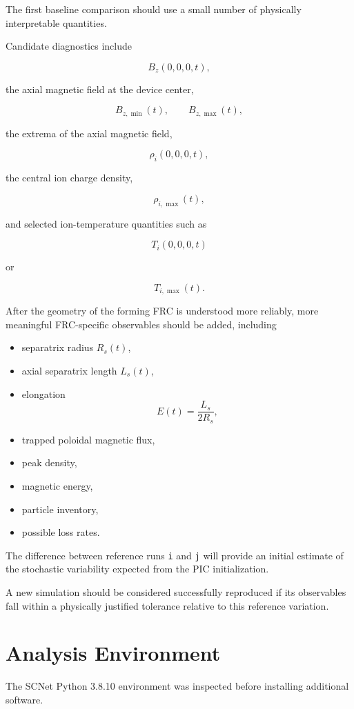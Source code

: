 \documentclass[11pt,a4paper]{article}
\begin{document}
The first baseline comparison should use a small number of physically interpretable quantities.

Candidate diagnostics include

\[
B_z(0,0,0,t),
\]

the axial magnetic field at the device center,

\[
B_{z,\min}(t),
\qquad
B_{z,\max}(t),
\]

the extrema of the axial magnetic field,

\[
\rho_i(0,0,0,t),
\]

the central ion charge density,

\[
\rho_{i,\max}(t),
\]

and selected ion-temperature quantities such as

\[
T_i(0,0,0,t)
\]

or

\[
T_{i,\max}(t).
\]

After the geometry of the forming FRC is understood more reliably, more meaningful FRC-specific observables should be added, including

\begin{itemize}
    \item separatrix radius \(R_s(t)\),
    \item axial separatrix length \(L_s(t)\),
    \item elongation
    \[
    E(t)=\frac{L_s}{2R_s},
    \]
    \item trapped poloidal magnetic flux,
    \item peak density,
    \item magnetic energy,
    \item particle inventory,
    \item possible loss rates.
\end{itemize}

The difference between reference runs \texttt{i} and \texttt{j} will provide an initial estimate of the stochastic variability expected from the PIC initialization.

A new simulation should be considered successfully reproduced if its observables fall within a physically justified tolerance relative to this reference variation.

\section{Analysis Environment}

The SCNet Python 3.8.10 environment was inspected before installing additional software.
\end{document}
